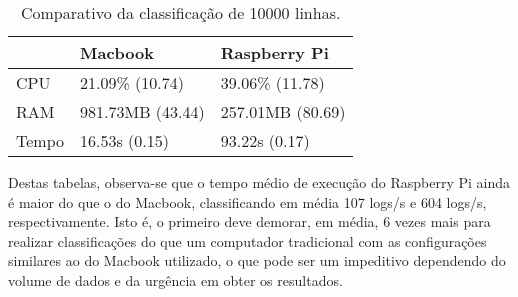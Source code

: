 \begin{table}[!ht]
    \centering
    \begin{tabular}{|l|l|l|}
    \hline
        ~ & Macbook & Raspberry Pi \\ \hline
        CPU & 21.09\% (10.74) & 39.06\% (11.78) \\ \hline
        RAM & 981.73MB (43.44) & 257.01MB (80.69) \\ \hline
        Tempo & 16.53s (0.15) & 93.22s (0.17) \\ \hline
    \end{tabular}

    \caption{Comparativo da classificação de 10000 linhas.\label{tab:comparativo_classificacao_10000}}
\end{table}


Destas tabelas, observa-se que o tempo médio de execução do Raspberry Pi ainda é maior 
do que o do Macbook, classificando em média 107 logs/s e 604 logs/s, respectivamente. Isto é,
o primeiro deve demorar, em média, 6 vezes mais para realizar classificações do que um computador tradicional 
com as configurações similares ao do Macbook utilizado, o que pode ser um impeditivo dependendo do 
volume de dados e da urgência em obter os resultados.
